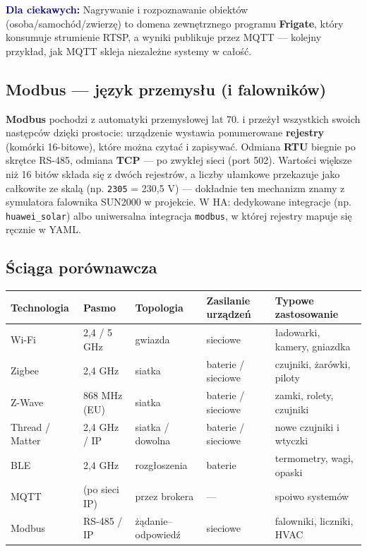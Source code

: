 \documentclass[11pt,a4paper]{article}
\newcommand{\ciekawostka}[1]{\par\medskip\noindent\textcolor{navy}{\textbf{Dla ciekawych:}} #1\par\medskip}
\begin{document}
\ciekawostka{Nagrywanie i rozpoznawanie obiektów (osoba/samochód/zwierzę) to domena zewnętrznego programu \textbf{Frigate}, który konsumuje strumienie RTSP, a wyniki publikuje przez MQTT --- kolejny przykład, jak MQTT skleja niezależne systemy w całość.}

\subsection{Modbus --- język przemysłu (i falowników)}

\textbf{Modbus} pochodzi z automatyki przemysłowej lat 70. i przeżył wszystkich swoich następców dzięki prostocie: urządzenie wystawia ponumerowane \textbf{rejestry} (komórki 16-bitowe), które można czytać i zapisywać. Odmiana \textbf{RTU} biegnie po skrętce RS-485, odmiana \textbf{TCP} --- po zwykłej sieci (port 502). Wartości większe niż 16 bitów składa się z dwóch rejestrów, a liczby ułamkowe przekazuje jako całkowite ze skalą (np. \texttt{2305} = 230,5 V) --- dokładnie ten mechanizm znamy z symulatora falownika SUN2000 w projekcie. W HA: dedykowane integracje (np. \texttt{huawei\_solar}) albo uniwersalna integracja \texttt{modbus}, w której rejestry mapuje się ręcznie w YAML.

\subsection{Ściąga porównawcza}

\begin{center}
\begin{tabular}{>{\raggedright\arraybackslash}p{2.7cm} p{2.1cm} p{2.5cm} p{2.2cm} p{3.4cm}}
\toprule
\textbf{Technologia} & \textbf{Pasmo} & \textbf{Topologia} & \textbf{Zasilanie urządzeń} & \textbf{Typowe zastosowanie}\\
\midrule
Wi-Fi & 2,4 / 5 GHz & gwiazda & sieciowe & ładowarki, kamery, gniazdka\\
Zigbee & 2,4 GHz & siatka & baterie / sieciowe & czujniki, żarówki, piloty\\
Z-Wave & 868 MHz (EU) & siatka & baterie / sieciowe & zamki, rolety, czujniki\\
Thread / Matter & 2,4 GHz / IP & siatka / dowolna & baterie / sieciowe & nowe czujniki i wtyczki\\
BLE & 2,4 GHz & rozgłoszenia & baterie & termometry, wagi, opaski\\
MQTT & (po sieci IP) & przez brokera & --- & spoiwo systemów\\
Modbus & RS-485 / IP & żądanie--odpowiedź & sieciowe & falowniki, liczniki, HVAC\\
\bottomrule
\end{tabular}
\end{center}
\end{document}
